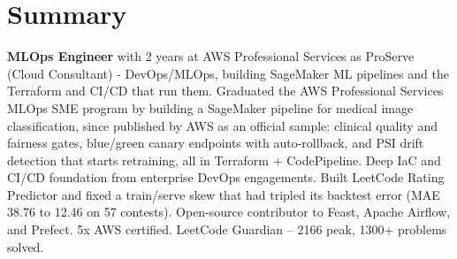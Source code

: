 \section{\textbf{Summary}}
\vspace{1pt}
\small{\textbf{MLOps Engineer} with 2 years at AWS Professional Services as ProServe (Cloud Consultant) - DevOps/MLOps, building SageMaker ML pipelines and the Terraform and CI/CD that run them. Graduated the AWS Professional Services MLOps SME program by building a SageMaker pipeline for medical image classification, since published by AWS as an official sample: clinical quality and fairness gates, blue/green canary endpoints with auto-rollback, and PSI drift detection that starts retraining, all in Terraform + CodePipeline. Deep IaC and CI/CD foundation from enterprise DevOps engagements. Built LeetCode Rating Predictor and fixed a train/serve skew that had tripled its backtest error (MAE 38.76 to 12.46 on 57 contests). Open-source contributor to Feast, Apache Airflow, and Prefect. 5x AWS certified. LeetCode Guardian -- 2166 peak, 1300+ problems solved.}
\vspace{-2mm}
